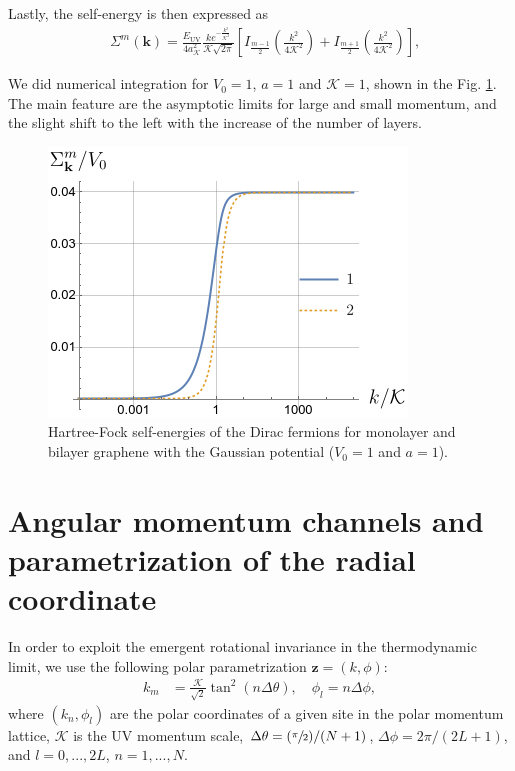 \documentclass[english,aps,prd,nofootinbib,twocolumn]{revtex4-1}
\begin{document}
Lastly, the self-energy is then expressed as
\begin{equation}
\begin{split}
&\Sigma^{m}\!(\mathbf{k })
\! = \!
\frac{E_{\mathrm{UV}}}{4a_{\mathcal{K}}^{2}}
\frac{k e^{-\frac{k^{2}}{\mathcal{K}^{2}}}}{\mathcal{K}\sqrt{2\pi}}
\!\!
\left[ 
I_{\frac{m-1}{2}}\!\!
\left(\frac{k^{2}}{4\mathcal{K}^{2}}\right)
\!\! + \!
I_{\frac{m+1}{2}}\!\!
\left(\frac{k^{2}}{4\mathcal{K}^{2}}\right)
\!
\right]
\!
,
\end{split}
\end{equation}

We did numerical integration for $V_{0}=1$, $a=1$ and $\mathcal{K}=1$, shown in the Fig.  \ref{fig:Multilayer-Self-Energies}. The main feature are the asymptotic limits for large and small momentum, and the slight shift to the left with the increase of the number of layers. 
\begin{figure}[h]
\centering
\includegraphics[scale=0.6]{GaussSelfEnergies.png}
\caption{Hartree-Fock self-energies of the Dirac fermions for monolayer and bilayer graphene with the Gaussian potential ($V_{0}=1$ and $a=1$). }
\label{fig:Multilayer-Self-Energies}
\end{figure}

\section{Angular momentum channels and parametrization of the radial coordinate}
In order to exploit the emergent rotational invariance in the thermodynamic limit, we use the following polar parametrization $\mathbf{z}=(k,\phi)$:
\begin{equation}
\label{eq:Tangential-radius}
\begin{split}
    k_{m} &= \frac{\mathcal{K}}{\sqrt{2}} \tan^{2}(n \Delta \theta), 
    \quad \phi_{l}=n\Delta \phi,
\end{split}
\end{equation}
where $(k_n,\phi_l)$ are the polar coordinates of a given site in the polar momentum lattice, $\mathcal{K}$ is the UV momentum scale, $\Delta \theta = (\sfrac{\pi}{2}) /(N+1)$, $\Delta \phi = 2\pi/(2L+1)$, and $l={0,...,2L}$, $n={1,...,N}$. 
\end{document}
